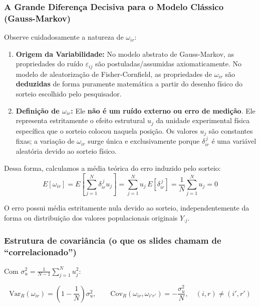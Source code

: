\documentclass[
]{article}
\providecommand{\tightlist}{%
  \setlength{\itemsep}{0pt}\setlength{\parskip}{0pt}}
\begin{document}
\subsubsection{A Grande Diferença Decisiva para o Modelo Clássico
(Gauss-Markov)}\label{a-grande-diferenuxe7a-decisiva-para-o-modelo-cluxe1ssico-gauss-markov}

Observe cuidadosamente a natureza de \(\omega_{ir}\):

\begin{enumerate}
\def\labelenumi{\arabic{enumi}.}
\tightlist
\item
  \textbf{Origem da Variabilidade:} No modelo abstrato de Gauss-Markov,
  as propriedades do ruído \(\varepsilon_{ij}\) são postuladas/assumidas
  axiomaticamente. No modelo de aleatorização de Fisher-Cornfield, as
  propriedades de \(\omega_{ir}\) são \textbf{deduzidas} de forma
  puramente matemática a partir do desenho físico do sorteio escolhido
  pelo pesquisador.
\item
  \textbf{Definição de \(\omega_{ir}\):} Ele \textbf{não é um ruído
  externo ou erro de medição}. Ele representa estritamente o efeito
  estrutural \(u_j\) da unidade experimental física específica que o
  sorteio colocou naquela posição. Os valores \(u_j\) são constantes
  fixas; a variação de \(\omega_{ir}\) surge única e exclusivamente
  porque \(\delta_{ir}^{\,j}\) é uma variável aleatória devido ao
  sorteio físico.
\end{enumerate}

Dessa forma, calculamos a média teórica do erro induzido pelo sorteio:
\[E[\omega_{ir}] = E\left[ \sum_{j=1}^{N} \delta_{ir}^{\,j} u_j \right] = \sum_{j=1}^{N} u_j\, E[\delta_{ir}^{\,j}] = \frac{1}{N} \sum_{j=1}^{N} u_j = 0\]

O erro possui média estritamente nula devido ao sorteio,
independentemente da forma ou distribuição dos valores populacionais
originais \(Y_{\cdot j}\).

\subsubsection{Estrutura de covariância (o que os slides chamam de
``correlacionado'')}\label{estrutura-de-covariuxe2ncia-o-que-os-slides-chamam-de-correlacionado}

Com \(\sigma_u^2 = \frac{1}{N-1}\sum_{j=1}^{N} u_j^2\):

\[\mathrm{Var}_R(\omega_{ir}) = \left(1 - \frac{1}{N}\right)\sigma_u^2, \qquad \mathrm{Cov}_R(\omega_{ir}, \omega_{i'r'}) = -\frac{\sigma_u^2}{N}, \quad (i,r) \neq (i',r')\]
\end{document}
